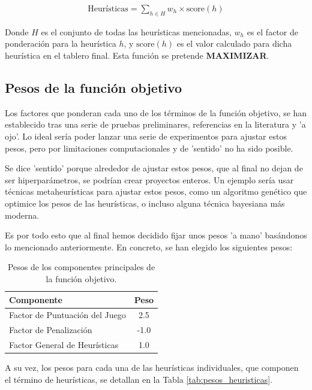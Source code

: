 \documentclass[11pt,spanish,listoffigures,listoftables]{tfgetsinf}
\begin{document}
\begin{align*}
\text{Heurísticas} = \sum_{h \in H} w_h \times \text{score}(h)
\end{align*}

Donde $H$ es el conjunto de todas las heurísticas mencionadas, $w_h$ es el factor de ponderación para la heurística $h$, y $\text{score}(h)$ es el valor calculado para dicha heurística en el tablero final. Esta función se pretende \textbf{MAXIMIZAR}.

\subsection{Pesos de la función objetivo}
Los factores que ponderan cada uno de los términos de la función objetivo, se han establecido tras una serie de pruebas preliminares, referencias en la literatura \cite{} y 'a ojo'. Lo ideal sería poder lanzar una serie de experimentos para ajustar estos pesos, pero por limitaciones computacionales y de 'sentido' no ha sido posible.

Se dice 'sentido' porque alrededor de ajustar estos pesos, que al final no dejan de ser hiperparámetros, se podrían crear proyectos enteros. Un ejemplo sería usar técnicas metaheurísticas para ajustar estos pesos, como un algoritmo genético que optimice los pesos de las heurísticas, o incluso alguna técnica bayesiana más moderna.

Es por todo esto que al final hemos decidido fijar unos pesos 'a mano' basándonos lo mencionado anteriormente. En concreto, se han elegido los siguientes pesos:
\begin{table}[H]
    \centering
    \caption{Pesos de los componentes principales de la función objetivo.}
    \label{tab:pesos_principales}
    \begin{tabular}{lc}
        \toprule
        \textbf{Componente} & \textbf{Peso} \\
        \midrule
        Factor de Puntuación del Juego & 2.5 \\
        Factor de Penalización & -1.0 \\
        Factor General de Heurísticas & 1.0 \\
        \bottomrule
    \end{tabular}
\end{table}

A su vez, los pesos para cada una de las heurísticas individuales, que componen el término de heurísticas, se detallan en la Tabla \ref{tab:pesos_heuristicas}.
\end{document}
